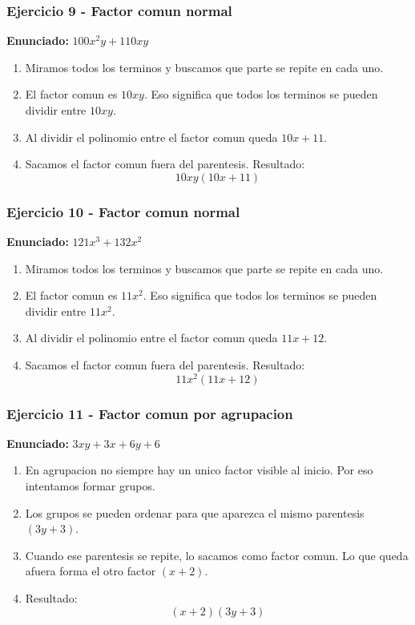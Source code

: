 \documentclass[11pt,a4paper]{article}
\begin{document}
\vspace{0.2cm}
\subsubsection*{Ejercicio 9 - Factor comun normal}
\textbf{Enunciado:} $ 100 x^{2} y + 110 x y $\par
\begin{enumerate}[leftmargin=2em]
\item Miramos todos los terminos y buscamos que parte se repite en cada uno.
\item El factor comun es \(10 x y\). Eso significa que todos los terminos se pueden dividir entre \(10 x y\).
\item Al dividir el polinomio entre el factor comun queda \(10 x + 11\).
\item Sacamos el factor comun fuera del parentesis. Resultado: \[\boxed{10 x y\left(10 x + 11\right)}\]
\end{enumerate}

\vspace{0.2cm}
\subsubsection*{Ejercicio 10 - Factor comun normal}
\textbf{Enunciado:} $ 121 x^{3} + 132 x^{2} $\par
\begin{enumerate}[leftmargin=2em]
\item Miramos todos los terminos y buscamos que parte se repite en cada uno.
\item El factor comun es \(11 x^{2}\). Eso significa que todos los terminos se pueden dividir entre \(11 x^{2}\).
\item Al dividir el polinomio entre el factor comun queda \(11 x + 12\).
\item Sacamos el factor comun fuera del parentesis. Resultado: \[\boxed{11 x^{2}\left(11 x + 12\right)}\]
\end{enumerate}

\vspace{0.2cm}
\subsubsection*{Ejercicio 11 - Factor comun por agrupacion}
\textbf{Enunciado:} $ 3 x y + 3 x + 6 y + 6 $\par
\begin{enumerate}[leftmargin=2em]
\item En agrupacion no siempre hay un unico factor visible al inicio. Por eso intentamos formar grupos.
\item Los grupos se pueden ordenar para que aparezca el mismo parentesis \((3 y + 3)\).
\item Cuando ese parentesis se repite, lo sacamos como factor comun. Lo que queda afuera forma el otro factor \((x + 2)\).
\item Resultado: \[\boxed{\left(x + 2\right)\left(3 y + 3\right)}\]
\end{enumerate}
\end{document}
